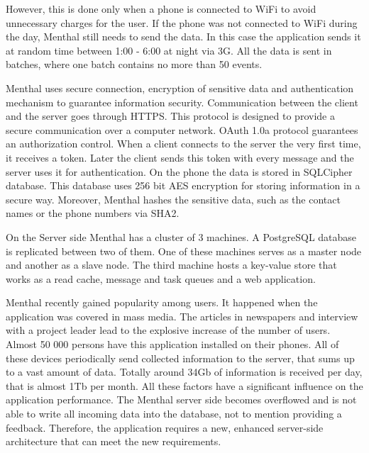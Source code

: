 However, this is done only when a phone is connected to WiFi to avoid unnecessary charges for the user.
If the phone was not connected to WiFi during the day, Menthal still needs to send the data.
In this case the application sends it at random time between 1:00 - 6:00 at night via 3G.
All the data is sent in batches, where one batch contains no more than 50 events.

Menthal uses secure connection, encryption of sensitive data and authentication mechanism to guarantee information security.
Communication between the client and the server goes through HTTPS.
This protocol is designed to provide a secure communication over a computer network. 
OAuth 1.0a protocol guarantees an authorization control.
When a client connects to the server the very first time, it receives a token.
Later the client sends this token with every message and the server uses it for authentication.
On the phone the data is stored in SQLCipher database.
This database uses 256 bit AES encryption for storing information in a secure way.
Moreover, Menthal hashes the sensitive data, such as the contact names or the phone numbers via SHA2. 

On the Server side Menthal has a cluster of 3 machines.
A PostgreSQL database is replicated between two of them.
One of these machines serves as a master node and another as a slave node.
The third machine hosts a key-value store that works as a read cache, message and task queues and a web application.
 
Menthal recently gained popularity among users.
It happened when the application was covered in mass media.
The articles in newspapers and interview with a project leader lead to the explosive increase of the number of users.
Almost 50 000 persons have this application installed on their phones.
All of these devices periodically send collected information to the server, that sums up to a vast amount of data.
Totally around 34Gb of information is received per day, that is almost 1Tb per month.
All these factors have a significant influence on the application performance.
The Menthal server side becomes overflowed and is not able to write all incoming data into the database, not to mention providing a feedback.
Therefore, the application requires a new, enhanced server-side architecture that can meet the new requirements.